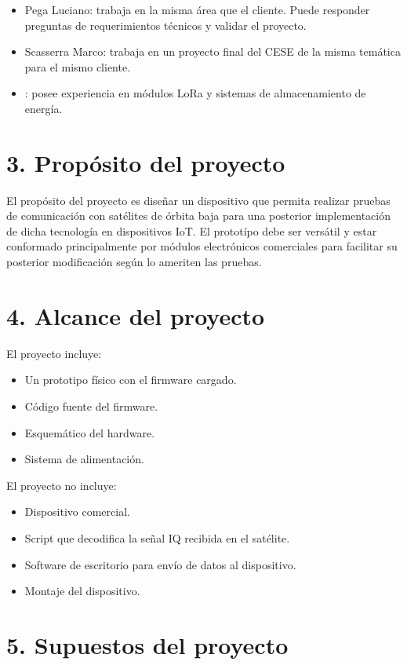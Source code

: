 \documentclass[
11pt, %
codirector, %
]{charter}
\begin{document}
\begin{itemize}
	\item Pega Luciano: trabaja en la misma área que el cliente. Puede responder preguntas de requerimientos técnicos y validar el proyecto.
	\item Scasserra Marco: trabaja en un proyecto final del CESE de la misma temática para el mismo cliente.
	\item \supname: posee experiencia en módulos LoRa y sistemas de almacenamiento de energía.
\end{itemize}



\section{3. Propósito del proyecto}
\label{sec:proposito}

El propósito del proyecto es diseñar un dispositivo que permita realizar pruebas de comunicación con satélites de órbita baja para una posterior implementación de dicha tecnología en dispositivos IoT. El prototípo debe ser versátil y estar conformado principalmente por módulos electrónicos comerciales para facilitar su posterior modificación según lo ameriten las pruebas.


\section{4. Alcance del proyecto}
\label{sec:alcance}

El proyecto incluye:
\begin{itemize}
	\item Un prototipo físico con el firmware cargado.
	\item Código fuente del firmware.
	\item Esquemático del hardware.
	\item Sistema de alimentación.
\end{itemize}
El proyecto no incluye:
\begin{itemize}
	\item Dispositivo comercial.
	\item Script que decodifica la señal IQ recibida en el satélite.
	\item Software de escritorio para envío de datos al dispositivo.
	\item Montaje del dispositivo.
\end{itemize}


\section{5. Supuestos del proyecto}
\label{sec:supuestos}
\end{document}
